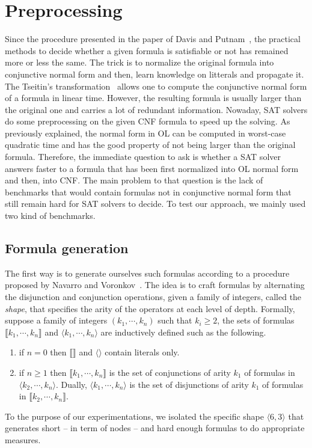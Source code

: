 \documentclass[a4paper, 11pt]{article}
\begin{document}
    \section{Preprocessing}
    Since the procedure presented in the paper of Davis and Putnam~\cite{10.1145/321033.321034}, the
    practical methods to decide whether a given formula is satisfiable or not has remained more or less
    the same. The trick is to normalize the original formula into conjunctive normal form and then,
    learn knowledge on litterals and propagate it. The Tseitin's transformation~\cite{Tseitin1983} 
    allows one to compute
    the conjunctive normal form of a formula in linear time. However, the resulting formula is usually
    larger than the original one and carries a lot of redundant information. Nowaday, SAT solvers do
    some preprocessing on the given CNF formula to speed up the solving. As previously explained, the
    normal form in OL can be computed in worst-case quadratic time and has the good property of not
    being larger than the original formula. Therefore, the immediate question to ask is whether a SAT
    solver answers faster to a formula that has been first normalized into OL normal form and then, into 
    CNF. The main problem to that question is the lack of benchmarks that would contain
    formulas not in conjunctive normal form that still remain hard for
    SAT solvers to decide. To test our approach, we mainly used two kind of benchmarks.
    \subsection{Formula generation}
    The first way is to generate ourselves such formulas according to a procedure
    proposed by Navarro and Voronkov~\cite{11cf478fe9d5463eb66cfafaa9577771}. The idea is to craft
    formulas by alternating the disjunction and conjunction operations, given a family of integers,
    called the \textit{shape}, that specifies the arity of the operators at each level of depth. 
    Formally,
    suppose a family of integers $(k_1,\cdots,k_n)$ such that $k_i\ge 2$, the sets of formulas
    $\llbracket k_1,\cdots,k_n\rrbracket$ and $\langle k_1,\cdots,k_n\rangle$ are inductively defined
    such as the following.
    \begin{enumerate}
	    \item
		if $n=0$ then $\llbracket\rrbracket$ and $\langle\rangle$ contain literals only.
	\item
		if $n\ge 1$ then $\llbracket k_1,\cdots,k_n\rrbracket$ is the set of conjunctions
		    of arity $k_1$ of formulas in $\langle k_2,\cdots,k_n\rangle$. Dually,
		    $\langle k_1,\cdots,k_n\rangle$ is the set of disjunctions of arity $k_1$ of
		    formulas in $\llbracket k_2,\cdots,k_n\rrbracket$.
    \end{enumerate}
    To the purpose of our experimentations, we isolated the specific shape $\langle 6,3\rangle$ that
    generates short -- in term of nodes -- and hard enough formulas to do appropriate measures.
\end{document}
